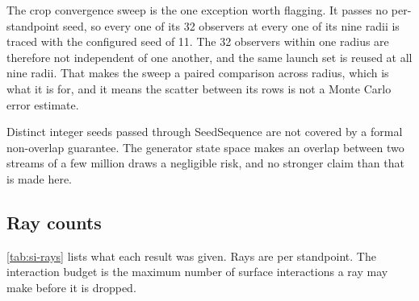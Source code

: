 \documentclass[journal]{IEEEtran}
\begin{document}
The crop convergence sweep is the one exception worth flagging. It passes no
per-standpoint seed, so every one of its 32 observers at every one of its nine
radii is traced with the configured seed of 11. The 32 observers within one
radius are therefore not independent of one another, and the same launch set is
reused at all nine radii. That makes the sweep a paired comparison across
radius, which is what it is for, and it means the scatter between its rows is
not a Monte Carlo error estimate.

Distinct integer seeds passed through SeedSequence are not covered by a formal
non-overlap guarantee. The generator state space makes an overlap between two
streams of a few million draws a negligible risk, and no stronger claim than
that is made here.

\subsection{Ray counts}

\cref{tab:si-rays} lists what each result was given. Rays are per standpoint.
The interaction budget is the maximum number of surface interactions a ray may
make before it is dropped.
\end{document}
